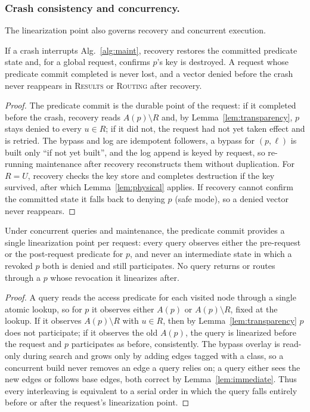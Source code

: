 \documentclass[sigconf, nonacm, review]{acmart}
\begin{document}
\subsubsection{Crash consistency and concurrency.}
\label{app:correct-crash}
The linearization point also governs recovery and concurrent execution.

\begin{lemma}
\label{lem:crash}
If a crash interrupts Alg.~\ref{alg:maint}, recovery restores the committed
predicate state and, for a global request, confirms $p$'s key is destroyed.
A request whose predicate commit completed is never lost, and a vector denied
before the crash never reappears in \textsc{Results} or \textsc{Routing} after
recovery.
\end{lemma}
\begin{proof}
The predicate commit is the durable point of the request: if it completed
before the crash, recovery reads $A(p)\setminus R$ and, by
Lemma~\ref{lem:transparency}, $p$ stays denied to every $u\in R$; if it did
not, the request had not yet taken effect and is retried. The bypass and log
are idempotent followers, a bypass for $(p,\ell)$ is built only ``if not yet
built'', and the log append is keyed by request, so re-running maintenance
after recovery reconstructs them without duplication. For $R=U$, recovery
checks the key store and completes destruction if the key survived, after which
Lemma~\ref{lem:physical} applies. If recovery cannot confirm the committed
state it falls back to denying $p$ (safe mode), so a denied vector never
reappears.
\end{proof}

\begin{lemma}[Concurrency]
\label{lem:concurrency}
Under concurrent queries and maintenance, the predicate commit provides a
single linearization point per request: every query observes either the
pre-request or the post-request predicate for $p$, and never an intermediate
state in which a revoked $p$ both is denied and still participates. No query
returns or routes through a $p$ whose revocation it linearizes after.
\end{lemma}
\begin{proof}
A query reads the access predicate for each visited node through a single
atomic lookup, so for $p$ it observes either $A(p)$ or $A(p)\setminus R$,
fixed at the lookup. If it observes $A(p)\setminus R$ with $u\in R$, then by
Lemma~\ref{lem:transparency} $p$ does not participate; if it observes the old
$A(p)$, the query is linearized before the request and $p$ participates as
before, consistently. The bypass overlay is read-only during search and grows
only by adding edges tagged with a class, so a concurrent build never removes
an edge a query relies on; a query either sees the new edges or follows base
edges, both correct by Lemma~\ref{lem:immediate}. Thus every interleaving is
equivalent to a serial order in which the query falls entirely before or after
the request's linearization point.
\end{proof}
\end{document}
